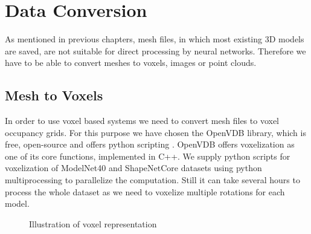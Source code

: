 \section{Data Conversion}
As mentioned in previous chapters,  mesh files, in which most existing 3D models are saved, are not suitable for direct processing by neural networks. Therefore we have to be able to convert meshes to voxels, images or point clouds.

\subsection{Mesh to Voxels}
In order to use voxel based systems we need to convert mesh files to voxel occupancy grids. For this purpose we have chosen the OpenVDB library, which is free, open-source and offers python scripting \cite{museth_openvdb:_2013}. OpenVDB offers voxelization as one of its core functions, implemented in C++. We supply python scripts for voxelization of ModelNet40 and ShapeNetCore datasets using python multiprocessing to parallelize the computation. Still it can take several hours to process the whole dataset as we need to voxelize multiple rotations for each model. 

\begin{figure}[!h]
	\centering
	\qquad
	\caption{Illustration of voxel representation}
\end{figure}

